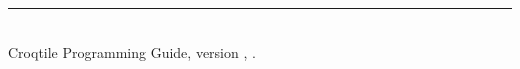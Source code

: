 \cleardoublepage
{}
{}



\vspace{1.5cm}
\begin{center}
\small\color{croqgray}
\rule{0.5\linewidth}{0.4pt}\\[6pt]
Croqtile Programming Guide, version \guideversion, \guidereleasedate.
\end{center}
